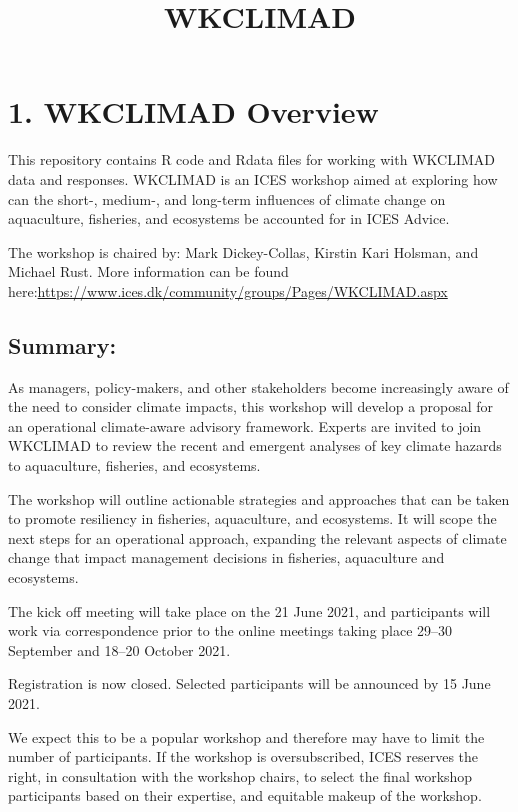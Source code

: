\documentclass[
]{article}
\title{WKCLIMAD}
\author{}
\date{\vspace{-2.5em}}
\begin{document}
\maketitle

{
\setcounter{tocdepth}{2}
\tableofcontents
}
\hypertarget{wkclimad-overview}{%
\section{1. WKCLIMAD Overview}\label{wkclimad-overview}}

This repository contains R code and Rdata files for working with
WKCLIMAD data and responses. WKCLIMAD is an ICES workshop aimed at
exploring how can the short-, medium-, and long-term influences of
climate change on aquaculture, fisheries, and ecosystems be accounted
for in ICES Advice.

The workshop is chaired by: Mark Dickey-Collas, Kirstin Kari Holsman,
and Michael Rust. More information can be found
here:\url{https://www.ices.dk/community/groups/Pages/WKCLIMAD.aspx}

\hypertarget{summary}{%
\subsection{Summary:}\label{summary}}

As managers, policy-makers, and other stakeholders become increasingly
aware of the need to consider climate impacts, this workshop will
develop a proposal for an operational climate-aware advisory framework.
Experts are invited to join WKCLIMAD to review the recent and emergent
analyses of key climate hazards to aquaculture, fisheries, and
ecosystems.

The workshop will outline actionable strategies and approaches that can
be taken to promote resiliency in fisheries, aquaculture, and
ecosystems. It will scope the next steps for an operational approach,
expanding the relevant aspects of climate change that impact management
decisions in fisheries, aquaculture and ecosystems.

The kick off meeting will take place on the 21 June 2021, and
participants will work via correspondence prior to the online meetings
taking place 29--30 September and 18--20 October 2021.

Registration is now closed. Selected participants will be announced by
15 June 2021.

We expect this to be a popular workshop and therefore may have to limit
the number of participants. If the workshop is oversubscribed, ICES
reserves the right, in consultation with the workshop chairs, to select
the final workshop participants based on their expertise, and equitable
makeup of the workshop.
\end{document}
